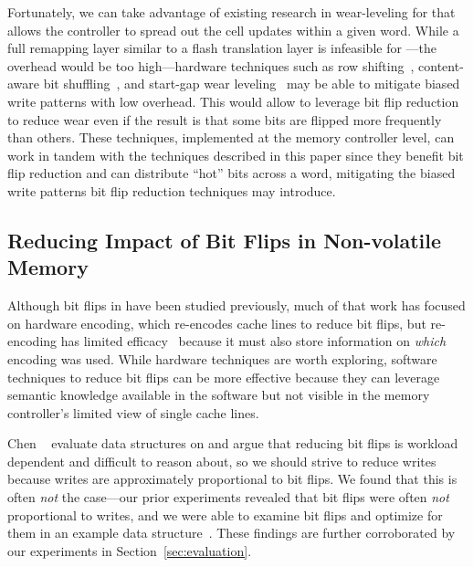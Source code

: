Fortunately, we can take advantage of existing research in wear-leveling for \NVM that allows
the controller to spread out the cell updates within a given word.
While a full remapping layer similar to a flash translation layer is infeasible
for \NVM---the overhead would be too high---hardware techniques such as row
shifting~\cite{zhou:isca09:fixed}, content-aware bit shuffling~\cite{Han:cabs}, and
start-gap wear leveling~\cite{qureshi:micro09} may be able to mitigate biased
write patterns with low overhead. This would allow \NVM to leverage bit flip
reduction to reduce wear even if the result is that some bits are flipped more
frequently than others.  These techniques, implemented at the memory
controller level, can work in tandem with the techniques described in this paper since they benefit
bit flip reduction and can distribute ``hot'' bits across a word, mitigating the biased write
patterns bit flip reduction techniques may introduce.


\subsection{Reducing Impact of Bit Flips in Non-volatile Memory}

Although bit flips in \NVM have been studied previously, much of that work has
focused on hardware encoding, which re-encodes cache lines to reduce bit flips,
but re-encoding has limited efficacy~\cite{flipnwrite,
	jacobvitz2013coset, seyedzadeh2016coset} because it must also store information
on \textit{which} encoding was used. While hardware techniques are worth
exploring, software techniques to reduce bit flips can be more effective because
they can leverage semantic knowledge available in the software but not
visible in the memory controller's limited view of single cache lines.

Chen \etal~\cite{Chen_rethinkingdatabase} evaluate data structures on \NVM and
argue that reducing bit flips is workload dependent and difficult to reason
about, so we should strive to reduce writes because writes are approximately
proportional to bit flips. We found that this is often \emph{not} the case---our prior experiments
revealed that bit flips were often \emph{not} proportional to writes, and we were able to
examine bit flips and optimize for them in an example data structure~\cite{bittman:nvmsa18}. These findings are further
corroborated by our experiments in Section~\ref{sec:evaluation}.

